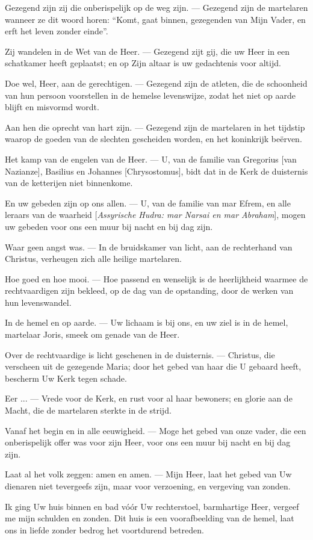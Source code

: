 \documentclass[12pt,twoside,a5paper]{article}
\newlength{\origparskip}
\newenvironment{halfparskip}{
  \setlength{\parskip}{0.5\origparskip}
}{
  \setlength{\parskip}{\origparskip}
}
\begin{document}
\begin{halfparskip}
  Gezegend zijn zij die onberispelijk op de weg zijn. --- Gezegend zijn de martelaren wanneer ze dit woord horen: ``Komt, gaat binnen, gezegenden van Mijn Vader, en erft het leven zonder einde''.

  Zij wandelen in de Wet van de Heer. --- Gezegend zijt gij, die uw Heer in een schatkamer heeft geplaatst; en op Zijn altaar is uw gedachtenis voor altijd.

  Doe wel, Heer, aan de gerechtigen. --- Gezegend zijn de atleten, die de schoonheid van hun persoon voorstellen in de hemelse levenswijze, zodat het niet op aarde blijft en misvormd wordt.

  Aan hen die oprecht van hart zijn. --- Gezegend zijn de martelaren in het tijdstip waarop de goeden van de slechten gescheiden worden, en het koninkrijk beërven.

  Het kamp van de engelen van de Heer. --- U, van de familie van Gregorius [van Nazianze], Basilius en Johannes [Chrysostomus], bidt dat in de Kerk de duisternis van de ketterijen niet binnenkome.

  En uw gebeden zijn op ons allen. --- U, van de familie van mar Efrem, en alle leraars van de waarheid [\emph{Assyrische Hudra: mar Narsai en mar Abraham}], mogen uw gebeden voor ons een muur bij nacht en bij dag zijn.

  Waar geen angst was. --- In de bruidskamer van licht, aan de rechterhand van Christus, verheugen zich alle heilige martelaren.

  Hoe goed en hoe mooi. --- Hoe passend en wenselijk is de heerlijkheid waarmee de rechtvaardigen zijn bekleed, op de dag van de opstanding, door de werken van hun levenswandel.

  In de hemel en op aarde. --- Uw lichaam is bij ons, en uw ziel is in de hemel, martelaar Joris, smeek om genade van de Heer.

  Over de rechtvaardige is licht geschenen in de duisternis. --- Christus, die verscheen uit de gezegende Maria; door het gebed van haar die U gebaard heeft, bescherm Uw Kerk tegen schade.

  Eer ... --- Vrede voor de Kerk, en rust voor al haar bewoners; en glorie aan de Macht, die de martelaren sterkte in de strijd.

  Vanaf het begin en in alle eeuwigheid. --- Moge het gebed van onze vader, die een onberispelijk offer was voor zijn Heer, voor ons een muur bij nacht en bij dag zijn.

  Laat al het volk zeggen: amen en amen. --- Mijn Heer, laat het gebed van Uw dienaren niet tevergeefs zijn, maar voor verzoening, en vergeving van zonden.

  Ik ging Uw huis binnen en bad vóór Uw rechterstoel, barmhartige Heer, vergeef me mijn schulden en zonden. Dit huis is een voorafbeelding van de hemel, laat ons in liefde zonder bedrog het voortdurend betreden.
\end{halfparskip}
\end{document}
